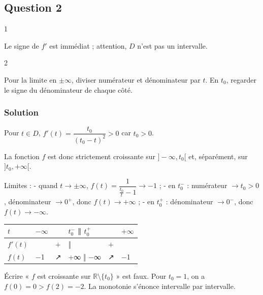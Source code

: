 \documentclass[11pt,a4paper]{article}
\begin{document}
\hypertarget{question-2}{%
\subsection{Question 2}\label{question-2}}

\begin{indication}{1}

Le signe de \(f'\) est immédiat ; attention, \(D\) n'est pas un intervalle.

\end{indication}

\begin{indication}{2}

Pour la limite en \(\pm\infty\), diviser numérateur et dénominateur par \(t\). En \(t_0\), regarder le signe du dénominateur de chaque côté.

\end{indication}

\hypertarget{solution-1}{%
\subsubsection{Solution}\label{solution-1}}

Pour \(t\in D\), \(f'(t)=\dfrac{t_0}{(t_0-t)^2}>0\) car \(t_0>0\).

La fonction \(f\) est donc strictement croissante sur \(]-\infty,t_0[\) et, séparément, sur \(]t_0,+\infty[\).

Limites :
- quand \(t\to\pm\infty\), \(f(t)=\dfrac1{\frac{t_0}{t}-1}\to-1\) ;
- en \(t_0^-\) : numérateur \(\to t_0>0\), dénominateur \(\to0^+\), donc \(f(t)\to+\infty\) ;
- en \(t_0^+\) : dénominateur \(\to0^-\), donc \(f(t)\to-\infty\).

\begin{longtable}[]{@{}llllll@{}}
\toprule\noalign{}
\(t\) & \(-\infty\) & & \(t_0^-\) ‖ \(t_0^+\) & & \(+\infty\) \\
\midrule\noalign{}
\endhead
\bottomrule\noalign{}
\endlastfoot
\(f'(t)\) & & \(+\) & ‖ & \(+\) & \\
\(f(t)\) & −1 & ↗ & +∞ ‖ −∞ & ↗ & −1 \\
\end{longtable}

\begin{piege}

Écrire « \(f\) est croissante sur \(\mathbb{R}\setminus\{t_0\}\) » est faux. Pour \(t_0=1\), on a \(f(0)=0>f(2)=-2\). La monotonie s'énonce intervalle par intervalle.

\end{piege}
\end{document}
